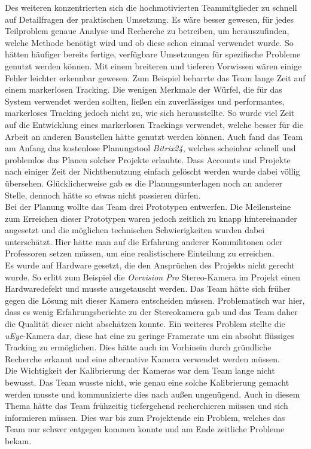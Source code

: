 Des weiteren konzentrierten sich die hochmotivierten Teammitglieder zu schnell auf Detailfragen der praktischen Umsetzung. Es wäre besser gewesen, für jedes Teilproblem genaue Analyse und Recherche zu betreiben, um herauszufinden, welche Methode benötigt wird und ob diese schon einmal verwendet wurde. So hätten häufiger bereits fertige, verfügbare Umsetzungen für spezifische Probleme genutzt werden können. Mit einem breiteren und tieferen Vorwissen wären einige Fehler leichter erkennbar gewesen. Zum Beispiel beharrte das Team lange Zeit auf einem markerlosen Tracking. Die wenigen Merkmale der Würfel, die für das System verwendet werden sollten, ließen ein zuverlässiges und performantes, markerloses Tracking jedoch nicht zu, wie sich herausstellte. So wurde viel Zeit auf die Entwicklung eines markerlosen Trackings verwendet, welche besser für die Arbeit an anderen Baustellen hätte genutzt werden können. 
Auch fand das Team am Anfang das kostenlose Planungstool \textit{Bitrix24}, welches scheinbar schnell und problemlos das Planen solcher Projekte erlaubte. Dass Accounts und Projekte nach einiger Zeit der Nichtbenutzung einfach gelöscht werden wurde dabei völlig übersehen. Glücklicherweise gab es die Planungsunterlagen noch an anderer Stelle, dennoch hätte so etwas nicht passieren dürfen.\\
Bei der Planung wollte das Team drei Prototypen entwerfen. Die Meilensteine zum Erreichen dieser Prototypen waren jedoch zeitlich zu knapp hintereinander angesetzt und die möglichen technischen Schwierigkeiten wurden dabei unterschätzt. Hier hätte man auf die Erfahrung anderer Kommilitonen oder Professoren setzen müssen, um eine realistischere Einteilung zu erreichen.\\
Es wurde auf Hardware gesetzt, die den Ansprüchen des Projekts nicht gerecht wurde. So erlitt zum Beispiel die \textit{Ovrvision Pro} Stereo-Kamera im Projekt einen Hardwaredefekt und musste ausgetauscht werden. Das Team hätte sich früher gegen die Lösung mit dieser Kamera entscheiden müssen. Problematisch war hier, dass es wenig Erfahrungsberichte zu der Stereokamera gab und das Team daher die Qualität dieser nicht abschätzen konnte.
Ein weiteres Problem stellte die \textit{uEye}-Kamera dar, diese hat eine zu geringe Framerate um ein absolut flüssiges Tracking zu ermöglichen. Dies hätte auch im Vorhinein durch gründliche Recherche erkannt und eine alternative Kamera verwendet werden müssen.\\
Die Wichtigkeit der Kalibrierung der Kameras war dem Team lange nicht bewusst. Das Team wusste nicht, wie genau eine solche Kalibrierung gemacht werden musste und kommunizierte dies nach außen ungenügend. Auch in diesem Thema hätte das Team frühzeitig tiefergehend recherchieren müssen und sich informieren müssen. Dies war bis zum Projektende ein Problem, welches das Team nur schwer entgegen kommen konnte und am Ende zeitliche Probleme bekam.\\
